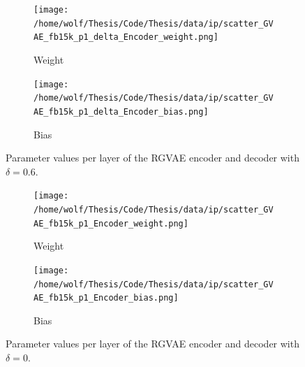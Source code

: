 \begin{figure}[H]
  \centering
  \begin{subfigure}{\textwidth}
    \texttt{[image: /home/wolf/Thesis/Code/Thesis/data/ip/scatter\_GVAE\_fb15k\_p1\_delta\_Encoder\_weight.png]}
    \caption{Weight}
    \label{fig5:deltaParamsW}
  \end{subfigure}
  \begin{subfigure}{\textwidth}
    \texttt{[image: /home/wolf/Thesis/Code/Thesis/data/ip/scatter\_GVAE\_fb15k\_p1\_delta\_Encoder\_bias.png]}
    \caption{Bias}
    \label{fig5:deltaParamsB}
  \end{subfigure}
\caption{Parameter values per layer of the RGVAE encoder and decoder with $\delta=0.6$.}
\label{fig5:deltaParams}
\end{figure}


\begin{figure}[H]
  \centering
  \begin{subfigure}{\textwidth}
    \texttt{[image: /home/wolf/Thesis/Code/Thesis/data/ip/scatter\_GVAE\_fb15k\_p1\_Encoder\_weight.png]}
    \caption{Weight}
    \label{fig5:normParamsW}
  \end{subfigure}
  \begin{subfigure}{\textwidth}
    \texttt{[image: /home/wolf/Thesis/Code/Thesis/data/ip/scatter\_GVAE\_fb15k\_p1\_Encoder\_bias.png]}
    \caption{Bias}
    \label{fig5:normParamsB}
  \end{subfigure}
\caption{Parameter values per layer of the RGVAE encoder and decoder with $\delta=0$.}
\label{fig5:normParams}
\end{figure}

